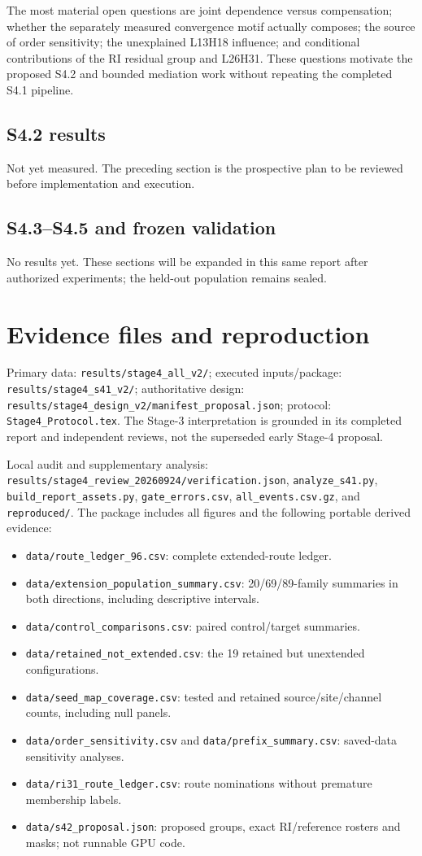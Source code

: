 \documentclass[11pt,a4paper]{article}
\newcommand{\file}[1]{\nolinkurl{#1}}
\begin{document}
The most material open questions are joint dependence versus compensation; whether the separately measured convergence motif actually composes; the source of order sensitivity; the unexplained L13H18 influence; and conditional contributions of the RI residual group and L26H31. These questions motivate the proposed S4.2 and bounded mediation work without repeating the completed S4.1 pipeline.

\subsection*{S4.2 results}
Not yet measured. The preceding section is the prospective plan to be reviewed before implementation and execution.
\subsection*{S4.3--S4.5 and frozen validation}
No results yet. These sections will be expanded in this same report after authorized experiments; the held-out population remains sealed.

\appendix
\section{Evidence files and reproduction}
Primary data: \file{results/stage4_all_v2/}; executed inputs/package:
\file{results/stage4_s41_v2/}; authoritative design:
\file{results/stage4_design_v2/manifest_proposal.json}; protocol:
\file{Stage4_Protocol.tex}. The Stage-3 interpretation is grounded in its completed report and independent reviews, not the superseded early Stage-4 proposal.

Local audit and supplementary analysis:
\file{results/stage4_review_20260924/verification.json},
\file{analyze_s41.py}, \file{build_report_assets.py},
\file{gate_errors.csv}, \file{all_events.csv.gz}, and \file{reproduced/}.
The package includes all figures and the following portable derived evidence:
\begin{itemize}
\item \file{data/route_ledger_96.csv}: complete extended-route ledger.
\item \file{data/extension_population_summary.csv}: 20/69/89-family summaries in both directions, including descriptive intervals.
\item \file{data/control_comparisons.csv}: paired control/target summaries.
\item \file{data/retained_not_extended.csv}: the 19 retained but unextended configurations.
\item \file{data/seed_map_coverage.csv}: tested and retained source/site/channel counts, including null panels.
\item \file{data/order_sensitivity.csv} and \file{data/prefix_summary.csv}: saved-data sensitivity analyses.
\item \file{data/ri31_route_ledger.csv}: route nominations without premature membership labels.
\item \file{data/s42_proposal.json}: proposed groups, exact RI/reference rosters and masks; not runnable GPU code.
\end{itemize}
\end{document}
